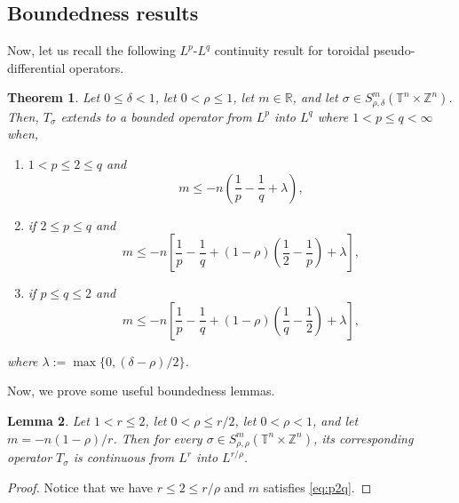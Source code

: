 \documentclass[12pt, reqno]{amsart}
\newtheorem{theorem}{Theorem}[section]
\newtheorem{lemma}[theorem]{Lemma}
\theoremstyle{definition}
\theoremstyle{remark}
\numberwithin{equation}{section}
\begin{document}
\subsection{Boundedness results}
\label{ssection:boundedness}
Now, let us recall the following $L^p$-$L^q$ continuity result for toroidal pseudo-differential operators.
\begin{theorem}
    \cite[Theorem~3.12]{Cardona:Martinez} Let $0\leq\delta<1$, let $0<\rho\leq 1$, let $m\in\mathbb{R}$, and let $\sigma\in S^m_{\rho,\delta}(\mathbb{T}^n\times\mathbb{Z}^n)$. Then, $T_\sigma$ extends to a bounded operator from $L^p$ into $L^q $ where $1<p\leq q<\infty$ when,  
    \begin{enumerate}
        \item $1<p\leq 2 \leq q$ and 
        \begin{equation}
             m \leq - n \left( \frac{1}{p} - \frac{1}{q} + \lambda
            \right),
            \label{eq:p2q}
        \end{equation}
        \item if $2 \leq p \leq q$ and 
        \begin{equation}
             m \leq - n \left[ \frac{1}{p} - \frac{1}{q} + (1-\rho) \left( \frac{1}{2} - \frac{1}{p}
            \right)
            + \lambda
            \right],
        \end{equation}
        \item if $p\leq q \leq 2$ and 
        \begin{equation}
             m \leq - n \left[ \frac{1}{p} - \frac{1}{q} + (1-\rho) \left( \frac{1}{q} - \frac{1}{2}
            \right)
            + \lambda
            \right],
        \end{equation}
    \end{enumerate}
     where $\lambda := \max\{ 0, (\delta-\rho)/2 \}$. 
     \label{theo:Lp-Lq}
\end{theorem}
Now, we prove some useful boundedness lemmas.
\begin{lemma}
    Let $1 < r \leq 2$, let $0<\rho\leq r/2$, let $0<\rho<1$, and let $m = -n(1-\rho)/r$. Then for every $\sigma \in S^m_{\rho,\rho}(\mathbb{T}^n \times \mathbb{Z}^n) $, its corresponding operator $T_\sigma$ is continuous from $L^r$ into $L^{r/\rho}$.
    \label{lem:Lr-Lr/rho-boundedness}
\end{lemma}
\begin{proof}
    Notice that we have $r\leq 2 \leq r/\rho$ and $m$ satisfies \cref{eq:p2q}.
\end{proof}
\end{document}
